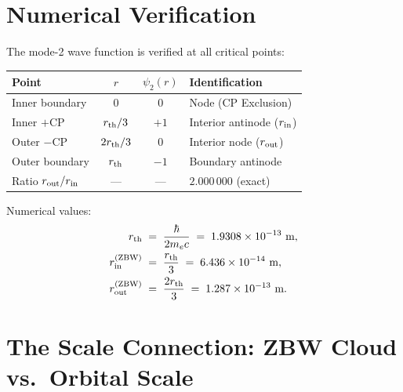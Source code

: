 \documentclass[12pt]{article}
\newcommand{\rth}{r_{\rm th}}
\newcommand{\rin}{r_{\rm in}}
\newcommand{\rout}{r_{\rm out}}
\begin{document}
\section{Numerical Verification}
\label{sec:numerical}

The mode-2 wave function is verified at all critical points:

\begin{center}
\renewcommand{\arraystretch}{1.4}
\begin{tabular}{@{}lccl@{}}
\toprule
Point & $r$ & $\psi_2(r)$ & Identification \\
\midrule
Inner boundary  & $0$           & $0$   & Node (CP Exclusion) \\
Inner $+$CP     & $\rth/3$      & $+1$  & Interior antinode ($\rin$) \\
Outer $-$CP     & $2\rth/3$     & $0$   & Interior node ($\rout$) \\
Outer boundary  & $\rth$        & $-1$  & Boundary antinode \\
\midrule
Ratio $\rout/\rin$ & --- & --- & $2.000\,000$ (exact) \\
\bottomrule
\end{tabular}
\end{center}

Numerical values:
\begin{align}
  \rth   &\;=\; \frac{\hbar}{2m_e c}
  \;=\; 1.9308\times 10^{-13}\ \text{m}, \notag\\
  \rin^{\rm (ZBW)} &\;=\; \frac{\rth}{3}
  \;=\; 6.436\times 10^{-14}\ \text{m}, \notag\\
  \rout^{\rm (ZBW)} &\;=\; \frac{2\rth}{3}
  \;=\; 1.287\times 10^{-13}\ \text{m}.
  \label{eq:numerical}
\end{align}

\section{The Scale Connection: ZBW Cloud vs.\ Orbital Scale}
\label{sec:scale}
\end{document}
